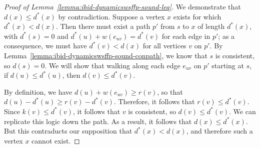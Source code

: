 \begin{proof}[Proof of Lemma~\ref{lemma:ibid-dynamicswsffp-sound-leq}]
We demonstrate that $d(x) \leq d^*(x)$ by contradiction.
Suppose a vertex $x$ exists for which $d^*(x) < d(x)$.
Then there must exist a path $p'$ from $s$ to $x$ of length $d^*(x)$,
with $d^*(s) = 0$ and $d^*(u) + w(e_{uv}) = d^*(v)$ for each edge
in $p'$;
as a consequence,
we must have $d^*(v) < d(x)$ for all vertices $v$ on $p'$.
By Lemma~\ref{lemma:ibid-dynamicswsffp-sound-conpath},
we know that $s$ is consistent,
so $d(s) = 0$.
We will show that walking along
each edge $e_{uv}$ on $p'$ starting at $s$,
if $d(u) \leq d^*(u)$,
then $d(v) \leq d^*(v)$.

By definition,
we have $d(u) + w(e_{uv}) \geq r(v)$,
so that $d(u) - d^*(u) \geq r(v) - d^*(v)$.
Therefore,
it follows that $r(v) \leq d^*(v)$.
Since $k(v) \leq d^*(v)$,
it follows that $v$ is consistent,
so $d(v) \leq d^*(v)$.
We can replicate this logic down the path.
As a result,
it follows that $d(x) \leq d^*(x)$.
But this contraducts our supposition that $d^*(x) < d(x)$,
and therefore such a vertex $x$ cannot exist.
\end{proof}
